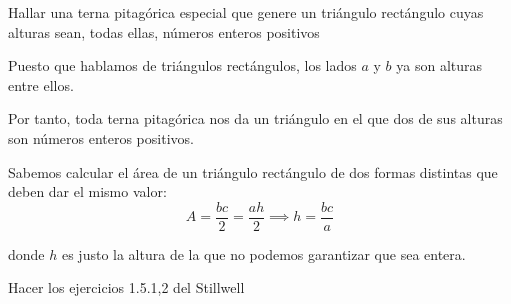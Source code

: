 \begin{problem}[13]
Hallar una terna pitagórica especial que genere un triángulo rectángulo cuyas alturas sean, todas ellas, números enteros positivos
\solution


Puesto que hablamos de triángulos rectángulos, los lados $a$ y $b$ ya son alturas entre ellos.

Por tanto, toda terna pitagórica nos da un triángulo en el que dos de sus alturas son números enteros positivos.

Sabemos calcular el área de un triángulo rectángulo de dos formas distintas que deben dar el mismo valor:
\[A = \frac{bc}{2} = \frac{ah}{2} \implies h = \frac{bc}{a}\]

donde $h$ es justo la altura de la que no podemos garantizar que sea entera.
\end{problem}

\begin{problem}[14]
Hacer los ejercicios 1.5.{1,2} del Stillwell
\solution

\end{problem}

